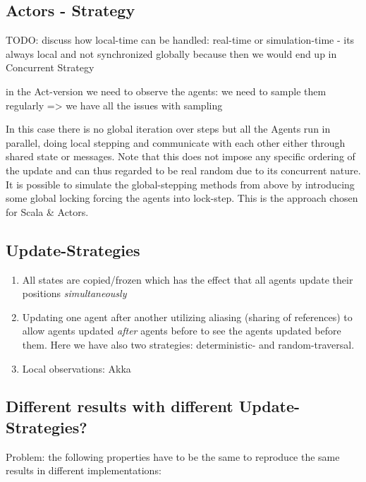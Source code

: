 \subsection{Actors - Strategy}
TODO: discuss how local-time can be handled: real-time or simulation-time - its always local and not synchronized globally because then we would end up in Concurrent Strategy

in the Act-version we need to observe the agents: we need to sample them regularly => we have all the issues with sampling 

In this case there is no global iteration over steps but all the Agents run in parallel, doing local stepping and communicate with each other either through shared state or messages. Note that this does not impose any specific ordering of the update and can thus regarded to be real random due to its concurrent nature. It is possible to simulate the global-stepping methods from above by introducing some global locking forcing the agents into lock-step. This is the approach chosen for Scala \& Actors.









\subsection{Update-Strategies}
\begin{enumerate}
\item All states are copied/frozen which has the effect that all agents update their positions \textit{simultaneously}
\item Updating one agent after another utilizing aliasing (sharing of references) to allow agents updated \textit{after} agents before to see the agents updated before them. Here we have also two strategies: deterministic- and random-traversal.
\item Local observations: Akka
\end{enumerate}



\subsection{Different results with different Update-Strategies?}
Problem: the following properties have to be the same to reproduce the same results in different implementations: \\

